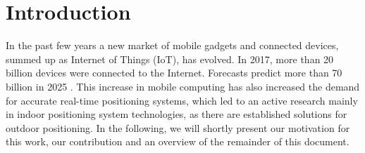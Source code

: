 
\chapter{Introduction} %

\label{Chapter1} %

In the past few years a new market of mobile gadgets and connected devices, summed up as Internet of Things (IoT), has evolved. In 2017, more than 20 billion devices were connected to the Internet. Forecasts predict more than 70 billion in 2025 \cite{Statista}. This increase in mobile computing has also increased the demand for accurate real-time positioning systems, which led to an active research mainly in indoor positioning system technologies, as there are established solutions for outdoor positioning.
In the following, we will shortly present our motivation for this work, our contribution and an overview of the remainder of this document.



